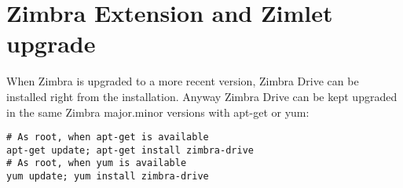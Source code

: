 \section{Zimbra Extension and Zimlet upgrade}

When Zimbra is upgraded to a more recent version, Zimbra Drive can be installed right from the installation.
Anyway Zimbra Drive can be kept upgraded in the same Zimbra major.minor versions with apt-get or yum:

\begin{verbatim}
# As root, when apt-get is available
apt-get update; apt-get install zimbra-drive
# As root, when yum is available
yum update; yum install zimbra-drive
\end{verbatim}
